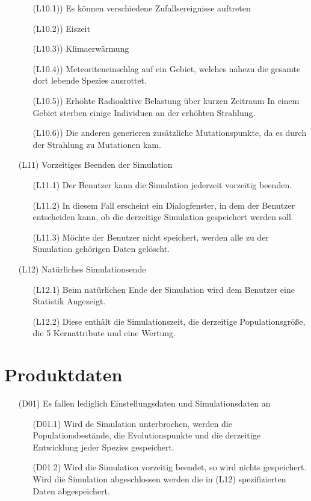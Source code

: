 \documentclass[a4paper, 10pt]{article}
\begin{document}
\begin{enumerate}
\begin{enumerate}
\item[(L10.1))]Es können verschiedene Zufallsereignisse auftreten
\item[(L10.2))]
Eiszeit
\item[(L10.3))]
Klimaerwärmung
\item[(L10.4))]
Meteoriteneinschlag auf ein Gebiet, welches nahezu die gesamte dort lebende Spezies ausrottet. 
\item[(L10.5))]
Erhöhte Radioaktive Belastung über kurzen Zeitraum
In einem Gebiet sterben einige Individuen an der erhöhten Strahlung. 
\item[(L10.6))]
Die anderen generieren zusätzliche Mutationspunkte, da es durch der Strahlung zu Mutationen kam.
\end{enumerate}

\item[(L11)] Vorzeitiges Beenden der Simulation
\begin{enumerate}
\item[(L11.1)]Der Benutzer kann die Simulation jederzeit vorzeitig beenden. 
\item[(L11.2)]
In diesem Fall erscheint ein Dialogfenster, in dem der Benutzer entscheiden kann, ob die derzeitige Simulation gespeichert werden soll. 
\item[(L11.3)]
Möchte der Benutzer nicht speichert, werden alle zu der Simulation gehörigen Daten gelöscht.
\end{enumerate}

\item[(L12)]Natürliches Simulationsende
\begin{enumerate}
\item[(L12.1)]Beim natürlichen Ende der Simulation wird dem Benutzer eine Statistik Angezeigt. 
\item[(L12.2)]
Diese enthält die Simulationszeit, die derzeitige Populationsgröße, die 5 Kernattribute und eine Wertung.
\end{enumerate}

\end{enumerate}

\section{Produktdaten}
\begin{enumerate}
\item[(D01)]
Es fallen lediglich Einstellungsdaten und Simulationsdaten an
\begin{enumerate}
\item[(D01.1)]
Wird de Simulation unterbrochen, werden die Populationsbestände, die Evolutionspunkte und die derzeitige Entwicklung jeder Spezies gespeichert.
\item[(D01.2)]
Wird die Simulation vorzeitig beendet, so wird nichts gespeichert.
Wird die Simulation abgeschlossen werden die in (L12) spezifizierten Daten abgespeichert.
\end{enumerate}
\end{enumerate}
\end{document}
